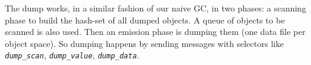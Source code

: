 The dump works, in a similar fashion of our naive GC, in two phases: a
scanning phase to build the hash-set of all dumped objects. A queue of
objects to be scanned is also used. Then an emission phase is dumping
them (one data file per object space). So dumping happens by sending
messages with selectors like \texttt{\textit{dump\_scan}},
\texttt{\textit{dump\_value}}, \texttt{\textit{dump\_data}}.



